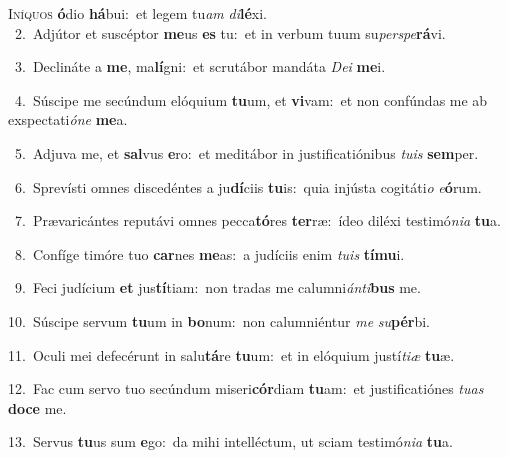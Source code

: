 \lettrine{\initial\textcolor{\initialcolor}{I}}{níquos} \textbf{ó}\-dio \textbf{há}\-bui:~\star et legem tu\textit{am} \textit{di}\-\textbf{lé}xi.\\
{\numbfont\textcolor{\numbcolor}{~2.}}~Adjútor et suscéptor \textbf{me}\-us \textbf{es} tu:~\star et in verbum tuum su\-\textit{per}\-\textit{spe}\textbf{rá}vi.\par
{\numbfont\textcolor{\numbcolor}{~3.}}~Declináte a \textbf{me}\-, ma\-\textbf{lí}\-gni:~\star et scrutábor mandáta \textit{De}\-\textit{i} \textbf{me}\-i.\par
{\numbfont\textcolor{\numbcolor}{~4.}}~Súscipe me secúndum elóquium \textbf{tu}\-um, et \textbf{vi}\-vam:~\star et non confúndas me ab exspectati\-\textit{ó}\-\textit{ne} \textbf{me}\-a.\par
{\numbfont\textcolor{\numbcolor}{~5.}}~Adjuva me, et \textbf{sal}\-vus \textbf{e}\-ro:~\star et meditábor in justificatiónibus \textit{tu}\-\textit{is} \textbf{sem}\-per.\par
{\numbfont\textcolor{\numbcolor}{~6.}}~Sprevísti omnes discedéntes a ju\-\textbf{dí}\-ciis \textbf{tu}\-is:~\star quia injústa cogitáti\textit{o} \textit{e}\-\textbf{ó}rum.\par
{\numbfont\textcolor{\numbcolor}{~7.}}~Prævaricántes reputávi omnes pecca\-\textbf{tó}\-res \textbf{ter}\-ræ:~\star ídeo diléxi testimó\-\textit{ni}\-\textit{a} \textbf{tu}\-a.\par
{\numbfont\textcolor{\numbcolor}{~8.}}~Confíge timóre tuo \textbf{car}\-nes \textbf{me}\-as:~\star a judíciis enim \textit{tu}\-\textit{is} \textbf{tí}\-\textbf{mu}i.\par
{\numbfont\textcolor{\numbcolor}{~9.}}~Feci judícium \textbf{et} jus\-\textbf{tí}\-tiam:~\star non tradas me calumni\-\textit{án}\-\textit{ti}\textbf{bus} me.\par
{\numbfont\textcolor{\numbcolor}{10.}}~Súscipe servum \textbf{tu}\-um in \textbf{bo}\-num:~\star non calumniéntur \textit{me} \textit{su}\-\textbf{pér}bi.\par
{\numbfont\textcolor{\numbcolor}{11.}}~Oculi mei defecérunt in salu\-\textbf{tá}\-re \textbf{tu}\-um:~\star et in elóquium justí\-\textit{ti}\-\textit{æ} \textbf{tu}\-æ.\par
{\numbfont\textcolor{\numbcolor}{12.}}~Fac cum servo tuo secúndum miseri\-\textbf{cór}\-diam \textbf{tu}\-am:~\star et justificatiónes \textit{tu}\-\textit{as} \textbf{do}\-\textbf{ce} me.\par
{\numbfont\textcolor{\numbcolor}{13.}}~Servus \textbf{tu}\-us sum \textbf{e}\-go:~\star da mihi intelléctum, ut sciam testimó\-\textit{ni}\-\textit{a} \textbf{tu}\-a.\par
